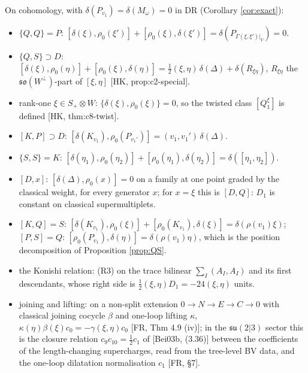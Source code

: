 \begin{definition}
\label{def:rels}
On cohomology, with $\delta(P_{v_1})=\delta(M_\omega)=0$ in DR (Corollary \ref{cor:exact}):
\begin{itemize}
\item[(R2)] $\{Q,Q\}=P$: $[\delta(\xi),\rho_0(\xi')]+[\rho_0(\xi),\delta(\xi')]=\delta(P_{\Gamma(\xi,\xi')|_V})=0$.
\item[(R3)] $\{Q,S\}\supset D$: $[\delta(\xi),\rho_0(\eta)]+[\rho_0(\xi),\delta(\eta)]=\frac12(\xi,\eta)\,\delta(\Delta)+\delta(R_{\xi\eta})$, $R_{\xi\eta}$ the $\mathfrak{so}(W^\perp)$-part of $[\xi,\eta]$ [HK, prop:c2-special].
\item[(R4)] rank-one $\xi\in S_+\otimes W$: $\{\delta(\xi),\rho_0(\xi)\}=0$, so the twisted class $[Q^\xi_1]$ is defined [HK, thm:c8-twist].
\item[(R5)] $[K,P]\supset D$: $[\delta(K_{v_1}),\rho_0(P_{v_1'})]=(v_1,v_1')\,\delta(\Delta)$.
\item[(R6)] $\{S,S\}=K$: $[\delta(\eta_1),\rho_0(\eta_2)]+[\rho_0(\eta_1),\delta(\eta_2)]=\delta([\eta_1,\eta_2])$.
\item[(R7)] $[D,x]$: $[\delta(\Delta),\rho_0(x)]=0$ on a family at one point graded by the classical weight, for every generator $x$; for $x=\xi$ this is $[D,Q]$: $D_1$ is constant on classical supermultiplets.
\item[(R9)] $[K,Q]=S$: $[\delta(K_{v_1}),\rho_0(\xi)]+[\rho_0(K_{v_1}),\delta(\xi)]=\delta(\rho(v_1)\xi)$; $[P,S]=Q$: $[\rho_0(P_{v_1}),\delta(\eta)]=\delta(\rho(v_1)\eta)$, which is the position decomposition of Proposition \ref{prop:QS}.
\item[(R10)] the Konishi relation: (R3) on the trace bilinear $\sum_I(A_I,A_I)$ and its first descendants, whose right side is $\frac12(\xi,\eta)D_1=-24(\xi,\eta)$ units.
\item[(R11)] joining and lifting: on a non-split extension $0\to N\to E\to C\to0$ with classical joining cocycle $\beta$ and one-loop lifting $\kappa$, $\kappa(\eta)\beta(\xi)c_0=-\gamma(\xi,\eta)c_0$ [FR, Thm 4.9 (iv)]; in the $\mathfrak{su}(2|3)$ sector this is the closure relation $c_9c_{10}=\frac12c_1$ of [Bei03b, (3.36)] between the coefficients of the length-changing supercharges, read from the tree-level BV data, and the one-loop dilatation normalisation $c_1$ [FR, §7].
\end{itemize}
\end{definition}

